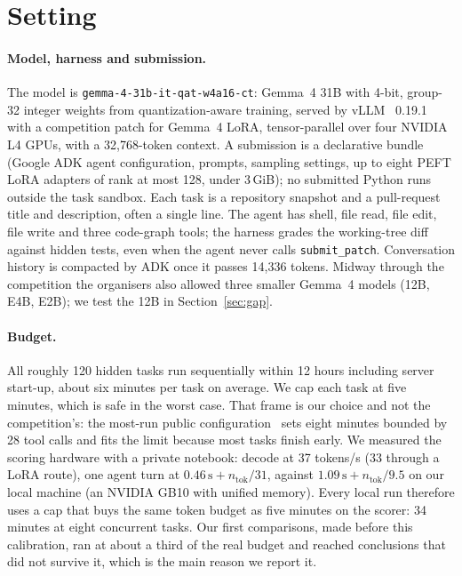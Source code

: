 \documentclass[11pt]{article}
\begin{document}
\section{Setting}\label{sec:setting}

\paragraph{Model, harness and submission.} The model is \texttt{gemma-4-31b-it-qat-w4a16-ct}: Gemma~4 31B with 4-bit, group-32 integer weights from quantization-aware training, served by vLLM~\citep{kwon2023vllm} 0.19.1 with a competition patch for Gemma~4 LoRA, tensor-parallel over four NVIDIA L4 GPUs, with a 32,768-token context. A submission is a declarative bundle (Google ADK agent configuration, prompts, sampling settings, up to eight PEFT LoRA adapters of rank at most 128, under 3\,GiB); no submitted Python runs outside the task sandbox. Each task is a repository snapshot and a pull-request title and description, often a single line. The agent has shell, file read, file edit, file write and three code-graph tools; the harness grades the working-tree diff against hidden tests, even when the agent never calls \texttt{submit\_patch}. Conversation history is compacted by ADK once it passes 14,336 tokens. Midway through the competition the organisers also allowed three smaller Gemma~4 models (12B, E4B, E2B); we test the 12B in Section~\ref{sec:gap}.

\paragraph{Budget.} All roughly 120 hidden tasks run sequentially within 12 hours including server start-up, about six minutes per task on average. We cap each task at five minutes, which is safe in the worst case. That frame is our choice and not the competition's: the most-run public configuration~\citep{henao2026budgetfit} sets eight minutes bounded by 28 tool calls and fits the limit because most tasks finish early. We measured the scoring hardware with a private notebook: decode at 37 tokens/s (33 through a LoRA route), one agent turn at $0.46\,\text{s} + n_\text{tok}/31$, against $1.09\,\text{s} + n_\text{tok}/9.5$ on our local machine (an NVIDIA GB10 with unified memory). Every local run therefore uses a cap that buys the same token budget as five minutes on the scorer: 34 minutes at eight concurrent tasks. Our first comparisons, made before this calibration, ran at about a third of the real budget and reached conclusions that did not survive it, which is the main reason we report it.
\end{document}
